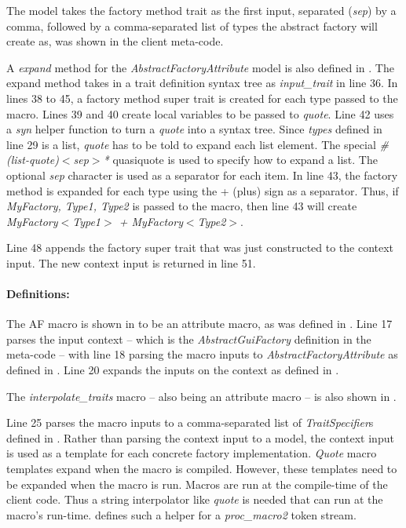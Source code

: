 The model takes the factory method trait as the first input, separated (\textit{sep}) by a comma, followed by a comma-separated list of types the abstract factory will create as, was shown in the client meta-code.

A \textit{expand} method for the \textit{AbstractFactoryAttribute} model is also defined in .
The expand method takes in a trait definition syntax tree as \textit{input\_trait} in line 36.
In lines 38 to 45, a factory method super trait is created for each type passed to the macro.
Lines 39 and 40 create local variables to be passed to \textit{quote}.
Line 42 uses a \textit{syn} helper function to turn a \textit{quote} into a syntax tree.
Since \textit{types} defined in line 29 is a list, \textit{quote} has to be told to expand each list element.
The special \textit{\#(list-quote)$<$sep$>$*} quasiquote is used to specify how to expand a list.
The optional \textit{sep} character is used as a separator for each item.
In line 43, the factory method is expanded for each type using the + (plus) sign as a separator.
Thus, if \textit{MyFactory, Type1, Type2} is passed to the macro, then line 43 will create \textit{MyFactory$<$Type1$>$ + MyFactory$<$Type2$>$}.

Line 48 appends the factory super trait that was just constructed to the context input.
The new context input is returned in line 51.

\paragraph{Definitions:}
The AF macro is shown in  to be an attribute macro, as was defined in .
Line 17 parses the input context -- which is the \textit{AbstractGuiFactory} definition in the meta-code -- with line 18 parsing the macro inputs to \textit{AbstractFactoryAttribute} as defined in .
Line 20 expands the inputs on the context as defined in .

The \textit{interpolate\_traits} macro -- also being an attribute macro -- is also shown in .

Line 25 parses the macro inputs to a comma-separated list of \textit{TraitSpecifier}s defined in .
Rather than parsing the context input to a model, the context input is used as a template for each concrete factory implementation.
\textit{Quote} macro templates expand when the macro is compiled.
However, these templates need to be expanded when the macro is run.
Macros are run at the compile-time of the client code.
Thus a string interpolator like \textit{quote} is needed that can run at the macro's run-time.
 defines such a helper for a \textit{proc\_macro2} token stream.

